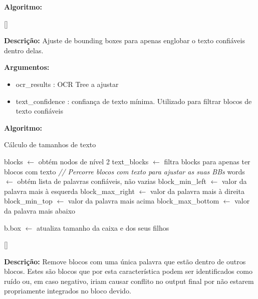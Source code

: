 \textbf{Algoritmo:}




[\normalsize]

\textbf{Descrição:} Ajuste de bounding boxes para apenas englobar o texto confiáveis dentro delas.

\textbf{Argumentos:}
\begin{itemize}\setlength\itemsep{-0.3em}
	\item ocr\_results : OCR Tree a ajustar
	\item text\_confidence : confiança de texto mínima. Utilizado para filtrar blocos de texto confiáveis
\end{itemize}

\textbf{Algoritmo:}

\begin{algorithm}[H]
	\caption{Cálculo de tamanhos de texto}
	\begin{algorithmic}[1]
		
		\STATE blocks $\leftarrow$ obtém nodos de nível 2
		\STATE text\_blocks $\leftarrow$ filtra blocks para apenas ter blocos com texto
		\STATE \textit{// Percorre blocos com texto para ajustar as suas BBs}
			\STATE words $\leftarrow$ obtém lista de palavras confiáveis, não vazias
			\STATE block\_min\_left $\leftarrow$ valor da palavra mais à esquerda
			\STATE block\_max\_right $\leftarrow$ valor da palavra mais à direita
			\STATE block\_min\_top $\leftarrow$ valor da palavra mais acima
			\STATE block\_max\_bottom $\leftarrow$ valor da palavra mais abaixo
			
				\STATE b.box $\leftarrow$ atualiza tamanho da caixa e dos seus filhos
			\ENDIF
		\ENDFOR

		
	\end{algorithmic}
\end{algorithm}




[\normalsize]

\textbf{Descrição:} Remove blocos com uma única palavra que estão dentro de outros blocos. Estes são blocos que por esta característica podem ser identificados como ruído ou, em caso negativo, iriam causar conflito no output final por não estarem propriamente integrados no bloco devido.

